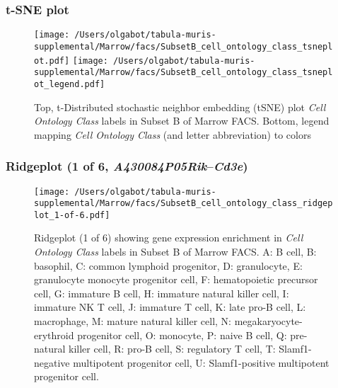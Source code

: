\clearpage
\subsubsection{t-SNE plot}
\begin{figure}[h]
\centering
\texttt{[image: /Users/olgabot/tabula-muris-supplemental/Marrow/facs/SubsetB\_cell\_ontology\_class\_tsneplot.pdf]}
\texttt{[image: /Users/olgabot/tabula-muris-supplemental/Marrow/facs/SubsetB\_cell\_ontology\_class\_tsneplot\_legend.pdf]}
\caption{Top, t-Distributed stochastic neighbor embedding (tSNE) plot  \emph{Cell Ontology Class} labels in Subset B of Marrow FACS. Bottom, legend mapping \emph{Cell Ontology Class} (and letter abbreviation) to colors}
\end{figure}


\clearpage

\subsubsection{Ridgeplot (1 of 6, \emph{A430084P05Rik}--\emph{Cd3e})}
\begin{figure}[h]
\centering
\texttt{[image: /Users/olgabot/tabula-muris-supplemental/Marrow/facs/SubsetB\_cell\_ontology\_class\_ridgeplot\_1-of-6.pdf]}

\caption{ Ridgeplot (1 of 6)  showing gene expression enrichment in \emph{Cell Ontology Class} labels in Subset B of Marrow FACS. A: B cell, B: basophil, C: common lymphoid progenitor, D: granulocyte, E: granulocyte monocyte progenitor cell, F: hematopoietic precursor cell, G: immature B cell, H: immature natural killer cell, I: immature NK T cell, J: immature T cell, K: late pro-B cell, L: macrophage, M: mature natural killer cell, N: megakaryocyte-erythroid progenitor cell, O: monocyte, P: naive B cell, Q: pre-natural killer cell, R: pro-B cell, S: regulatory T cell, T: Slamf1-negative multipotent progenitor cell, U: Slamf1-positive multipotent progenitor cell.}
\end{figure}


\clearpage

